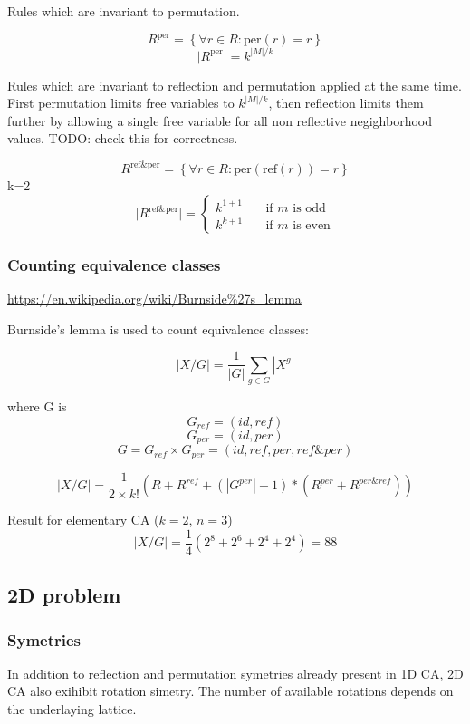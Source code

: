 \documentclass{ijuc}
\begin{document}
Rules which are invariant to permutation.

\[ R^\mathrm{per} = \left\{ \forall r \in R : \mathrm{per}(r) = r \right\} \]
\[ \vert R^\mathrm{per} \vert = k^{\vert M \vert / k} \]

Rules which are invariant to reflection and permutation applied at the same time.
First permutation limits free variables to \(k^{\vert M \vert / k}\), then reflection
limits them further by allowing a single free variable for all non reflective negighborhood values.
TODO: check this for correctness.

\[ R^\mathrm{ref \& per} = \left\{ \forall r \in R : \mathrm{per}(\mathrm{ref}(r)) = r \right\} \]
k=2
\[ \vert R^\mathrm{ref \& per} \vert = \left\{ 
  \begin{array}{ll}
    k^{1 + 1} & \quad \textrm{if $m$ is odd }\\
    k^{k + 1} & \quad \textrm{if $m$ is even}
  \end{array} \right.
\]
\subsubsection{Counting equivalence classes}

\url{https://en.wikipedia.org/wiki/Burnside%27s_lemma}

Burnside's lemma is used to count equivalence classes:

\[ |X/G| = \frac{1}{|G|}\sum_{g \in G}|X^g| \]

where G is 
\[ G_{ref} = (id, ref) \]
\[ G_{per} = (id, per) \]
\[ G = G_{ref} \times G_{per} = (id, ref, per, ref \& per) \]

\[ |X/G| = \frac{1}{2 \times k!} ( R + R^{ref} + (|G^{per}|-1)*(R^{per} + R^{per \& ref}) ) \]

Result for elementary CA (\(k=2\), \(n=3\))
\[ |X/G| = \frac{1}{4} (2^8 + 2^6 + 2^4 + 2^4) = 88 \]

\subsection{2D problem}

\subsubsection{Symetries}

In addition to reflection and permutation symetries already present in 1D CA,
2D CA also exihibit rotation simetry. The number of available rotations depends
on the underlaying lattice.
\end{document}
